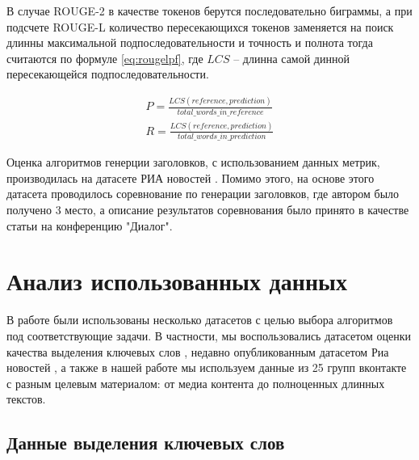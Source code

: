 \documentclass[14pt]{matmex-diploma-custom}
\begin{document}
В случае ROUGE-2 в качестве токенов берутся последовательно биграммы, а при подсчете ROUGE-L количество пересекающихся токенов заменяется на поиск длинны максимальной подпоследовательности и точность и полнота тогда считаются по формуле \ref{eq:rougelpf}, где $LCS$ -- длинна самой динной пересекающейся подпоследовательности.

\begin{equation}\label{eq:rougelpf}
\begin{gathered}
P = \frac{LCS(reference, prediction)}{total\_words\_in\_reference} \\ 
R = \frac{LCS(reference, prediction)}{total\_words\_in\_prediction}
\end{gathered}
\end{equation}

Оценка алгоритмов генерции заголовков, с использованием данных метрик, производилась на датасете 
РИА новостей \cite{gavrilov2018self}. Помимо этого,
на основе этого датасета проводилось соревнование по генерации заголовков, где автором было
получено 3 место, а описание результатов соревнования было принято в качестве статьи на конференцию "Диалог".



\section{Анализ использованных данных}

В работе были использованы несколько датасетов с целью выбора алгоритмов под соответствующие задачи.
В частности, мы воспользовались датасетом оценки качества выделения ключевых слов \cite{mannefedov2019}, недавно
опубликованным датасетом Риа новостей \cite{gavrilov2018self}, а также в нашей работе мы используем
данные из 25 групп вконтакте с разным целевым материалом: от медиа контента до полноценных длинных
текстов.

\subsection{Данные выделения ключевых слов}
\end{document}
